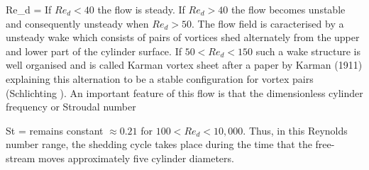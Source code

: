 %
\beq
  Re_d = 
\eeq
%
 If $Re_d < 40$ the flow is steady. If $Re_d > 40$
 the flow becomes unstable and consequently unsteady when
 $Re_d > 50$. The flow field is caracterised by a unsteady wake
 which consists of pairs of vortices shed alternately from the
 upper and lower part of the cylinder surface.
 If $50 < Re_d < 150$ such a wake structure is well organised and is
 called Karman vortex sheet after a paper by Karman (1911) explaining
 this alternation to be a stable configuration for vortex pairs
 (Schlichting ).
 An important feature of this flow is that the dimensionless
 cylinder frequency or Stroudal number

%
\beq
  St = 
\eeq
%
 remains constant $\approx 0.21$ for $100 < Re_d < 10,000$. Thus, in this
 Reynolds number range, the shedding cycle takes place during the time
 that the free-stream moves approximately five cylinder diameters.
%
